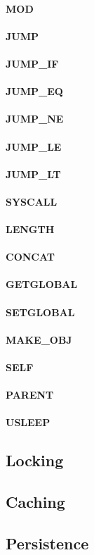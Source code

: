 \documentclass[12pt,a4paper]{article}
\begin{document}
\paragraph{MOD}
\paragraph{JUMP}
\paragraph{JUMP\_IF}
\paragraph{JUMP\_EQ}
\paragraph{JUMP\_NE}
\paragraph{JUMP\_LE}
\paragraph{JUMP\_LT}
\paragraph{SYSCALL}
\paragraph{LENGTH}
\paragraph{CONCAT}
\paragraph{GETGLOBAL}
\paragraph{SETGLOBAL}
\paragraph{MAKE\_OBJ}
\paragraph{SELF}
\paragraph{PARENT}
\paragraph{USLEEP}

\subsection{Locking}\label{sec:locking}

\subsection{Caching}\label{sec:caching}

\subsection{Persistence}\label{sec:persistence}
\end{document}
